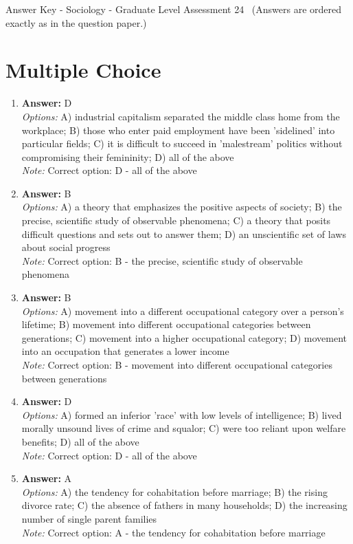 \documentclass[12pt]{article}
\begin{document}
\begin{center}
Answer Key - Sociology - Graduate Level Assessment 24 \
\small (Answers are ordered exactly as in the question paper.)
\end{center}

\section*{Multiple Choice}
\begin{enumerate}[label=\arabic*.]
\item \textbf{Answer:} D
\\ \textit{Options:} A) industrial capitalism separated the middle class home from the workplace; B) those who enter paid employment have been 'sidelined' into particular fields; C) it is difficult to succeed in 'malestream' politics without compromising their femininity; D) all of the above
\\ \textit{Note:} Correct option: D - all of the above
\item \textbf{Answer:} B
\\ \textit{Options:} A) a theory that emphasizes the positive aspects of society; B) the precise, scientific study of observable phenomena; C) a theory that posits difficult questions and sets out to answer them; D) an unscientific set of laws about social progress
\\ \textit{Note:} Correct option: B - the precise, scientific study of observable phenomena
\item \textbf{Answer:} B
\\ \textit{Options:} A) movement into a different occupational category over a person's lifetime; B) movement into different occupational categories between generations; C) movement into a higher occupational category; D) movement into an occupation that generates a lower income
\\ \textit{Note:} Correct option: B - movement into different occupational categories between generations
\item \textbf{Answer:} D
\\ \textit{Options:} A) formed an inferior 'race' with low levels of intelligence; B) lived morally unsound lives of crime and squalor; C) were too reliant upon welfare benefits; D) all of the above
\\ \textit{Note:} Correct option: D - all of the above
\item \textbf{Answer:} A
\\ \textit{Options:} A) the tendency for cohabitation before marriage; B) the rising divorce rate; C) the absence of fathers in many households; D) the increasing number of single parent families
\\ \textit{Note:} Correct option: A - the tendency for cohabitation before marriage
\end{enumerate}
\end{document}
